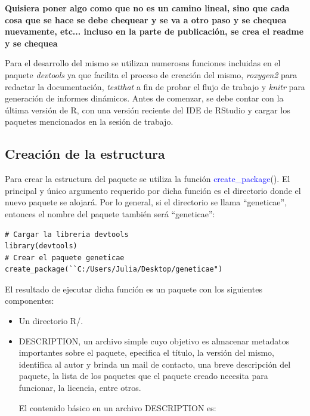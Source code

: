 \textbf{Quisiera poner algo como que no es un camino lineal, sino que cada cosa que se hace se debe chequear y se va a otro paso y se chequea nuevamente, etc... incluso en la parte de publicación, se crea el readme y se chequea}

Para el desarrollo del mismo se utilizan numerosas funciones incluidas en el paquete \emph{devtools} \citep{Hadley2019} ya que facilita el proceso de creación del mismo, \emph{roxygen2} para redactar la documentación, \emph{testthat} a fin de probar el flujo de trabajo y \emph{knitr} para generación de informes dinámicos. Antes de comenzar, se debe contar con la última versión de R, con una versión reciente del IDE de RStudio y cargar los paquetes mencionados en la sesión de trabajo. 



\subsection{Creación de la estructura}

Para crear la estructura del paquete se utiliza la función \textcolor{blue}{create\_package}(). El principal y único argumento requerido por dicha función es el directorio donde el nuevo paquete se alojará. Por lo general, si el directorio se llama ``geneticae'', entonces el nombre del paquete también será ``geneticae'':


\begin{lstlisting}
# Cargar la libreria devtools
library(devtools)
# Crear el paquete geneticae
create_package(``C:/Users/Julia/Desktop/geneticae")
\end{lstlisting}


El resultado de ejecutar dicha función es un paquete con los siguientes componentes:
\begin{itemize}
\item Un directorio R/.
\end{itemize}
\begin{itemize}
\item DESCRIPTION, un archivo simple cuyo objetivo es almacenar metadatos importantes sobre el paquete, epecifica el título, la versión del mismo, identifica al autor y brinda un mail de contacto, una breve descripción del paquete, la lista de los paquetes que el paquete creado necesita para funcionar, la licencia, entre otros.

El contenido básico en un archivo DESCRIPTION es:
\end{itemize}

